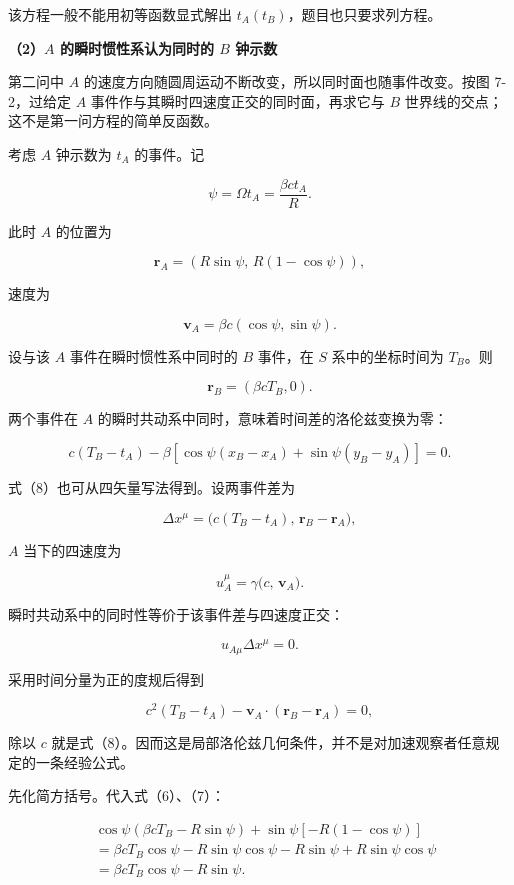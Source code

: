 \documentclass[12pt,a4paper,UTF8]{ctexart}
\begin{document}
该方程一般不能用初等函数显式解出 \(t_A(t_B)\)，题目也只要求列方程。

\textbf{（2）\(A\) 的瞬时惯性系认为同时的 \(B\) 钟示数}

第二问中 \(A\)
的速度方向随圆周运动不断改变，所以同时面也随事件改变。按图 7-2，过给定
\(A\) 事件作与其瞬时四速度正交的同时面，再求它与 \(B\)
世界线的交点；这不是第一问方程的简单反函数。

考虑 \(A\) 钟示数为 \(t_A\) 的事件。记

\[\psi=\Omega t_A=\frac{\beta ct_A}{R}. \tag{5}\]

此时 \(A\) 的位置为

\[\boldsymbol r_A=(R\sin\psi,\,R(1-\cos\psi)),\]

速度为

\[\boldsymbol v_A=\beta c(\cos\psi,\sin\psi). \tag{6}\]

设与该 \(A\) 事件在瞬时惯性系中同时的 \(B\) 事件，在 \(S\)
系中的坐标时间为 \(T_B\)。则

\[\boldsymbol r_B=(\beta cT_B,0). \tag{7}\]

两个事件在 \(A\) 的瞬时共动系中同时，意味着时间差的洛伦兹变换为零：

\[c(T_B-t_A)
-\beta\left[
\cos\psi(x_B-x_A)+\sin\psi(y_B-y_A)
\right]=0. \tag{8}\]

式（8）也可从四矢量写法得到。设两事件差为

\[\Delta x^\mu=\bigl(c(T_B-t_A),\,\boldsymbol r_B-\boldsymbol r_A\bigr),\]

\(A\) 当下的四速度为

\[u_A^\mu=\gamma\bigl(c,\,\boldsymbol v_A\bigr).\]

瞬时共动系中的同时性等价于该事件差与四速度正交：

\[u_{A\mu}\Delta x^\mu=0.\]

采用时间分量为正的度规后得到

\[c^2(T_B-t_A)-\boldsymbol v_A\cdot
(\boldsymbol r_B-\boldsymbol r_A)=0,\]

除以 \(c\)
就是式（8）。因而这是局部洛伦兹几何条件，并不是对加速观察者任意规定的一条经验公式。

先化简方括号。代入式（6）、（7）：

\[\begin{aligned}
&\cos\psi(\beta cT_B-R\sin\psi)
+\sin\psi[-R(1-\cos\psi)]\\
&=\beta cT_B\cos\psi
-R\sin\psi\cos\psi-R\sin\psi+R\sin\psi\cos\psi\\
&=\beta cT_B\cos\psi-R\sin\psi.
\end{aligned}\]
\end{document}

